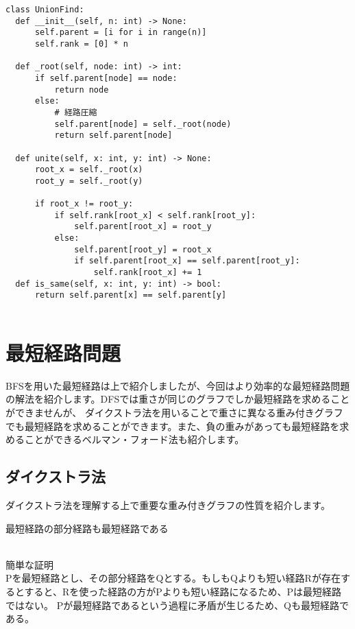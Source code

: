 \documentclass{jlreq}
\begin{document}
\begin{lstlisting}[caption=Union-Find木の実装, label=union_find, frame=TRBL, label={union_find}]
class UnionFind:
  def __init__(self, n: int) -> None:
      self.parent = [i for i in range(n)]
      self.rank = [0] * n
  
  def _root(self, node: int) -> int:
      if self.parent[node] == node:
          return node
      else:
          # 経路圧縮
          self.parent[node] = self._root(node)
          return self.parent[node]
  
  def unite(self, x: int, y: int) -> None:
      root_x = self._root(x)
      root_y = self._root(y)
      
      if root_x != root_y:
          if self.rank[root_x] < self.rank[root_y]:
              self.parent[root_x] = root_y
          else:
              self.parent[root_y] = root_x
              if self.parent[root_x] == self.parent[root_y]:
                  self.rank[root_x] += 1
  def is_same(self, x: int, y: int) -> bool:
      return self.parent[x] == self.parent[y]


\end{lstlisting}


\newpage
\section{最短経路問題}
BFSを用いた最短経路は上で紹介しましたが、今回はより効率的な最短経路問題の解法を紹介します。DFSでは重さが同じのグラフでしか最短経路を求めることができませんが、
ダイクストラ法を用いることで重さに異なる重み付きグラフでも最短経路を求めることができます。また、負の重みがあっても最短経路を求めることができるベルマン・フォード法も紹介します。

\subsection{ダイクストラ法}
ダイクストラ法を理解する上で重要な重み付きグラフの性質を紹介します。

\begin{theorembox}[経路緩和性]
  最短経路の部分経路も最短経路である


  \dotfill \\
  簡単な証明 \\
  Pを最短経路とし、その部分経路をQとする。もしもQよりも短い経路Rが存在するとすると、Rを使った経路の方がPよりも短い経路になるため、Pは最短経路ではない。
  Pが最短経路であるという過程に矛盾が生じるため、Qも最短経路である。
\end{theorembox}
\end{document}
